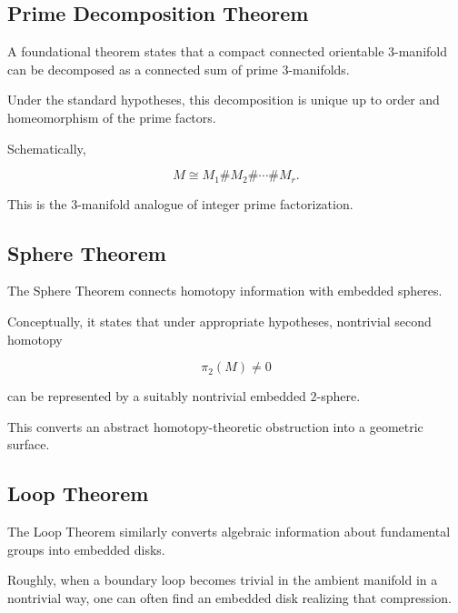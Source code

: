 \subsection{Prime Decomposition Theorem}
\label{subsec:prime-decomposition-three-manifolds}

A foundational theorem states that a compact connected orientable
\(3\)-manifold can be decomposed as a connected sum of prime
\(3\)-manifolds.

Under the standard hypotheses, this decomposition is unique up to order and
homeomorphism of the prime factors.

Schematically,

\[
\boxed{
M
\cong
M_1\#M_2\#\cdots\#M_r.
}
\]

This is the \(3\)-manifold analogue of integer prime factorization.

\subsection{Sphere Theorem}
\label{subsec:sphere-theorem}

The Sphere Theorem connects homotopy information with embedded spheres.

Conceptually, it states that under appropriate hypotheses, nontrivial
second homotopy

\[
\boxed{
\pi_2(M)\neq0
}
\]

can be represented by a suitably nontrivial embedded \(2\)-sphere.

This converts an abstract homotopy-theoretic obstruction into a geometric
surface.

\subsection{Loop Theorem}
\label{subsec:loop-theorem}

The Loop Theorem similarly converts algebraic information about fundamental
groups into embedded disks.

Roughly, when a boundary loop becomes trivial in the ambient manifold in a
nontrivial way, one can often find an embedded disk realizing that
compression.

